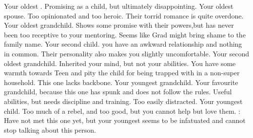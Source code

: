 \documentclass[char]{LRSguildcamp1}
\begin{document}
\begin{contacts}
	\contact{\cOldest{}} Your oldest \cOldest{\offspring}. Promising as a child, but ultimately disappointing. 
	\contact{\cOS{}}  Your oldest \cOldest{\offspring} spouse. Too opinionated and too heroic. Their torrid romance is quite overdone. 
	\contact{\cGrad{}} Your oldest grandchild. Shows some promise with their powers,but has never been too receptive to your mentoring. Seems like Grad might bring shame to the family name.  
	\contact{\cArchitect{}}  Your second child. you have an awkward relationship and nothing in common. Their personality also makes you slightly uncomfortable. 
	\contact{\cTeen{}} Your second oldest grandchild. Inherited your mind, but not your abilities. You have some warmth towards Teen and pity the child for being trapped with in a non-super household. This one lacks backbone. 
	\contact{\cTween{}} Your youngest grandchild. Your favourite grandchild, because this one has spunk and does not follow the rules. Useful abilities, but needs discipline and training. Too easily distracted. 
	\contact{\cYoungest{}} Your youngest child. Too much of a rebel, and too good, but you cannot help but love them. 
	\contact{\cYS{}}: Have not met this one yet, but your youngest seems to be infatuated and cannot stop talking about this person. 
	
\end{contacts}
\end{document}
